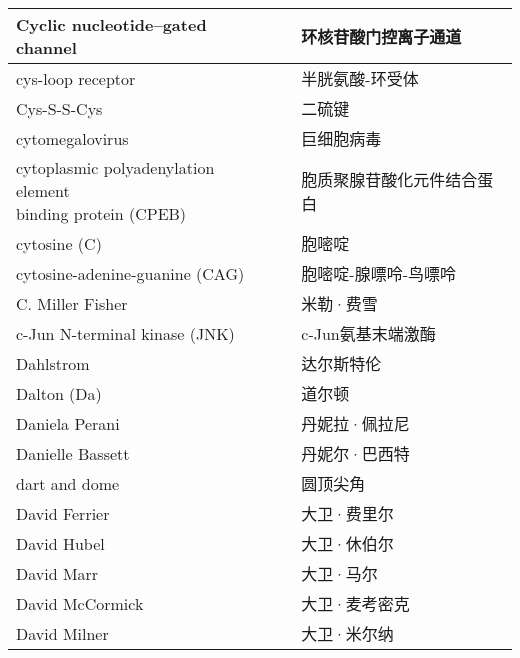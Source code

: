 \begin{longtable}{lll}
	\midrule
	Cyclic nucleotide–gated channel    &&  环核苷酸门控离子通道  \\
	
	\midrule
	cys-loop receptor    &&  半胱氨酸-环受体  \\
	
	\midrule
	Cys-S-S-Cys    &&  二硫键  \\
	
	\midrule
	cytomegalovirus    &&  巨细胞病毒  \\
	
	\midrule
	\makecell[l]{cytoplasmic polyadenylation element \\ binding protein  (CPEB)}   &&  胞质聚腺苷酸化元件结合蛋白  \\
	
	\midrule
	cytosine (C)     &&  胞嘧啶  \\
	
	\midrule
	cytosine-adenine-guanine (CAG)     &&  胞嘧啶-腺嘌呤-鸟嘌呤  \\
	
	\midrule
	C. Miller Fisher     &&  米勒·费雪  \\
	
	\midrule
	c-Jun N-terminal kinase (JNK)    &&  c-Jun氨基末端激酶  \\
	
	\midrule
	Dahlstrom   &&  达尔斯特伦  \\
	
	\midrule
	Dalton (Da)   &&  道尔顿  \\
	
	\midrule
	Daniela Perani     &&  丹妮拉·佩拉尼  \\
	
	\midrule
	Danielle Bassett     &&  丹妮尔·巴西特  \\
	
	\midrule
	dart and dome     &&  圆顶尖角  \\
	
	\midrule
	David Ferrier     &&  大卫·费里尔  \\
	
	\midrule
	David Hubel     &&  大卫·休伯尔  \\
	
	\midrule
	David Marr     &&  大卫·马尔  \\
	
	\midrule
	David McCormick     &&  大卫·麦考密克  \\
	
	\midrule
	David Milner     &&  大卫·米尔纳  \\
	

\end{longtable}
